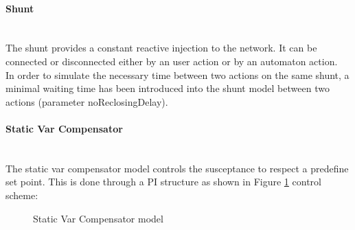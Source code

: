 \documentclass[a4paper, 12pt]{report}
\begin{document}
\paragraph{Shunt}
~~\\

The shunt provides a constant reactive injection to the network. It can be connected or disconnected either by an user action or by an automaton action. \\ 
In order to simulate the necessary time between two actions on the same shunt, a minimal waiting time has been introduced into the shunt model between two actions (parameter noReclosingDelay). \\

\paragraph{Static Var Compensator}
~~\\

The static var compensator model controls the susceptance to respect a predefine set point. This is done through a PI structure as shown in Figure \ref{StaticVarCompensator} control scheme:

\begin{figure}[h]
  \setlength{\abovecaptionskip}{15pt}
\centering
 \caption{Static Var Compensator model}
 \label{StaticVarCompensator}
\end{figure}
\end{document}
